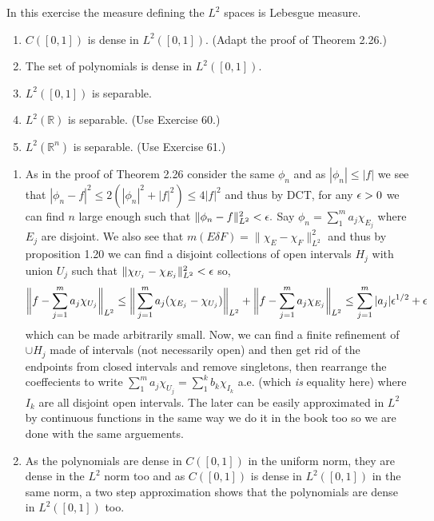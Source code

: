 \documentclass[12pt,a4paper]{article}
\begin{document}
\begin{problem}\label{prob:5-62}
In this exercise the measure defining the $L^2$ spaces is Lebesgue measure.
\begin{enumerate}[label=\alph*.]
\item $C([0,1])$ is dense in $L^2([0,1])$. (Adapt the proof of Theorem 2.26.)
\item The set of polynomials is dense in $L^2([0,1])$.
\item $L^2([0,1])$ is separable.
\item $L^2(\mathbb{R})$ is separable. (Use Exercise 60.)
\item $L^2(\mathbb{R}^n)$ is separable. (Use Exercise 61.)
\end{enumerate}
\end{problem}
\begin{solution}
    \begin{enumerate}[label=\alph*.]
        \item As in the proof of Theorem 2.26 consider the same $\phi_n$ and as $|\phi_n|\leq|f|$ we see that $|\phi_n-f|^2\leq 2(|\phi_n|^2+|f|^2)\leq4|f|^2$ and thus by DCT, for any $\epsilon>0$ we can find $n$ large enough such that $\|\phi_n-f\|_{L^2}^2<\epsilon.$ 
            Say $\phi_n=\sum_1^ma_j\chi_{E_j}$ where $E_j$ are disjoint. 
             We also see that $m(E\delta F)=\|\chi_E-\chi_F\|_{L^2}^2$ and thus by proposition 1.20 we can find a disjoint collections of open intervals $H_j$ with union $U_j$ such that $\|\chi_{U_j}-\chi_{E_j}\|_{L^2}^2<\epsilon$ so, 
            \[
                \bigg\|f-\sum_{j=1}^ma_j\chi_{U_j}\bigg\|_{L^2}\leq \bigg\|\sum_{j=1}^ma_j(\chi_{E_j}-\chi_{U_j})\bigg\|_{L^2}+ \bigg\|f-\sum_{j=1}^ma_j\chi_{E_j}\bigg\|_{L^2}\leq\sum_{j=1}^m|a_j|\epsilon^{1/2}+\epsilon
            \]
            which can be made arbitrarily small. 
            Now, we can find a finite refinement of $\cup H_j$ made of intervals (not necessarily open) and then get rid of the endpoints from closed intervals and remove singletons, then rearrange the coeffecients to write $\sum_1^ma_j\chi_{U_j}=\sum_1^kb_k\chi_{I_k}$ a.e. (which \textit{is} equality here) where $I_k$ are all disjoint open intervals. 
            The later can be easily approximated in $L^2$ by continuous functions in the same way we do it in the book too so we are done with the same arguements. 
        \item As the polynomials are dense in $C([0,1])$ in the uniform norm, they are dense in the $L^2$ norm too and as $C([0,1])$ is dense in $L^2([0,1])$ in the same norm, a two step approximation shows that the polynomials are dense in $L^2([0,1])$ too. 

\end{enumerate}
\end{solution}
\end{document}
